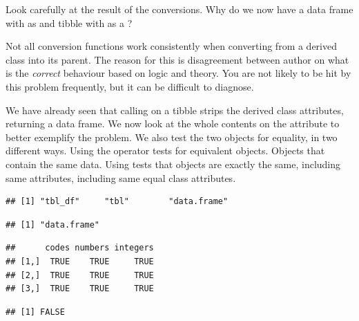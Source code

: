 \documentclass[krantz2,ChapterTOCs]{krantz}\usepackage{knitr}
\begin{document}
\begin{playground}
Look carefully at the result of the conversions. Why do we now have a data frame with  as  and tibble with  as a ?
\end{playground}

\begin{explainbox}
Not all conversion functions work consistently when converting from a derived class into its parent. The reason for this is disagreement between author on what is the \emph{correct} behaviour based on logic and theory. You are not likely to be hit by this problem frequently, but it can be difficult to diagnose.

We have already seen that calling  on a tibble strips the derived class attributes, returning a data frame. We now look at the whole contents on the  attribute to better exemplify the problem. We also test the two objects for equality, in two different ways. Using the operator \code{==} tests for equivalent objects. Objects that contain the same data. Using  tests that objects are exactly the same, including same attributes, including same equal class attributes.

\begin{knitrout}\footnotesize
{}\color{fgcolor}\begin{kframe}
\begin{alltt}
\end{alltt}
\begin{verbatim}
## [1] "tbl_df"     "tbl"        "data.frame"
\end{verbatim}
\begin{alltt}
\end{alltt}
\begin{verbatim}
## [1] "data.frame"
\end{verbatim}
\begin{alltt}
 \hlopt{==} 
\end{alltt}
\begin{verbatim}
##      codes numbers integers
## [1,]  TRUE    TRUE     TRUE
## [2,]  TRUE    TRUE     TRUE
## [3,]  TRUE    TRUE     TRUE
\end{verbatim}
\begin{alltt}
\end{alltt}
\begin{verbatim}
## [1] FALSE
\end{verbatim}
\end{kframe}
\end{knitrout}


\end{explainbox}
\end{document}
